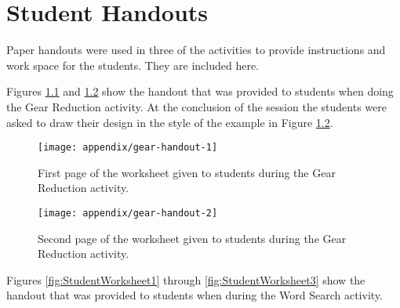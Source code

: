 \chapter{Student Handouts}

Paper handouts were used in three of the activities to provide instructions and work space for the students. They are included here.


	\label{sec:gearshandout}
	
	Figures \ref{fig:gearshandout1} and \ref{fig:gearshandout2} show the handout that was provided to students when doing the Gear Reduction activity. At the conclusion of the session the students were asked to draw their design in the style of the example in Figure \ref{fig:gearshandout2}.
	
\setlength\fboxsep{0pt}
\setlength\fboxrule{0.5pt}


	\begin{figure}
	\centering
	\texttt{[image: appendix/gear-handout-1]}
	\caption[Gear Reduction handout, page 1.]{First page of the worksheet given to students during the Gear Reduction activity.}
	\label{fig:gearshandout1}
	\end{figure}

	\begin{figure}
	\centering
	\texttt{[image: appendix/gear-handout-2]}
	\caption[Gear Reduction handout, page 2.]{Second page of the worksheet given to students during the Gear Reduction activity.}
	\label{fig:gearshandout2}
	\end{figure}


	\label{sec:wordsearchhandout}
	Figures \ref{fig:StudentWorksheet1} through \ref{fig:StudentWorksheet3} show the handout that was provided to students when during the Word Search activity.
	

